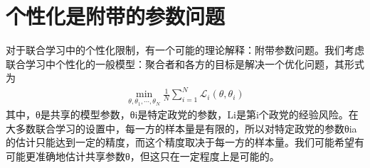 \section{个性化是附带的参数问题}
对于联合学习中的个性化限制，有一个可能的理论解释：附带参数问题。我们考虑联合学习中个性化的一般模型：聚合者和各方的目标是解决一个优化问题，其形式为
\begin{align}
	\min_{\theta, \theta_{1}, \cdots, \theta_{N}} \frac{1}{N} \sum_{i=1}^{N} \mathcal{L}_{i}(\theta, \theta_{i}) \label{eq:4-27}
\end{align}
其中，θ是共享的模型参数，θi是特定政党的参数，Li是第i个政党的经验风险。在大多数联合学习的设置中，每一方的样本量是有限的，所以对特定政党的参数θia的估计只能达到一定的精度，而这个精度取决于每一方的样本量。我们可能希望有可能更准确地估计共享参数θ，但这只在一定程度上是可能的。

